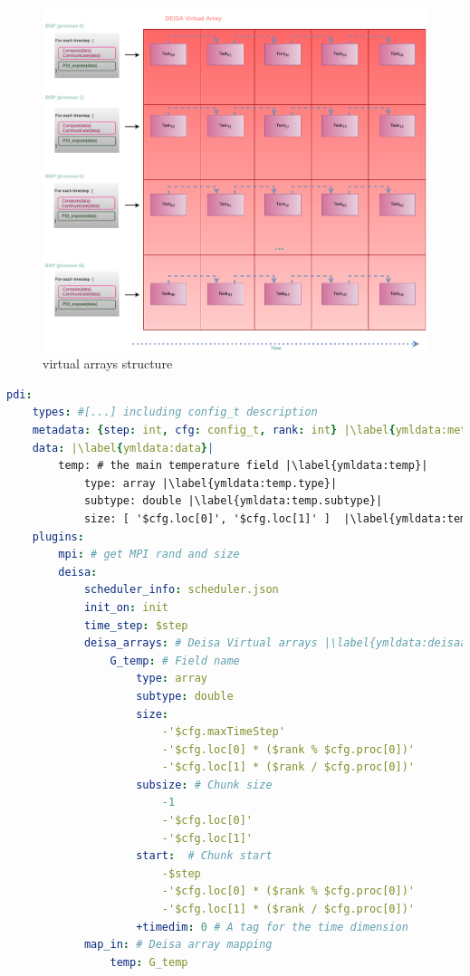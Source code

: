 \begin{figure}\centering
\includegraphics[scale=0.5]{figures/DeisaVirtualArrays.pdf}
\caption{\deisa virtual arrays structure}
\label{figdeisarray}
\end{figure}

\begin{lstlisting}[float, label=ymldata, language=yaml, caption=Data description in \pdi \deisa YAML file]
pdi:
    types: #[...] including config_t description
    metadata: {step: int, cfg: config_t, rank: int} |\label{ymldata:metadata}|
    data: |\label{ymldata:data}|
        temp: # the main temperature field |\label{ymldata:temp}|
            type: array |\label{ymldata:temp.type}|
            subtype: double |\label{ymldata:temp.subtype}|
            size: [ '$cfg.loc[0]', '$cfg.loc[1]' ]  |\label{ymldata:temp.size}|
    plugins:
        mpi: # get MPI rand and size
        deisa:
            scheduler_info: scheduler.json
            init_on: init 
            time_step: $step 
            deisa_arrays: # Deisa Virtual arrays |\label{ymldata:deisaarra}|
                G_temp: # Field name
                    type: array
                    subtype: double
                    size:
                        -'$cfg.maxTimeStep'
                        -'$cfg.loc[0] * ($rank % $cfg.proc[0])'
                        -'$cfg.loc[1] * ($rank / $cfg.proc[0])'
                    subsize: # Chunk size
                        -1
                        -'$cfg.loc[0]'
                        -'$cfg.loc[1]'
                    start:  # Chunk start
                        -$step
                        -'$cfg.loc[0] * ($rank % $cfg.proc[0])'
                        -'$cfg.loc[1] * ($rank / $cfg.proc[0])'
                    +timedim: 0 # A tag for the time dimension
            map_in: # Deisa array mapping
                temp: G_temp    
\end{lstlisting}


